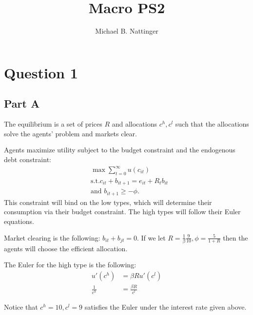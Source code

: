 \documentclass[11pt]{article} %
\title{Macro PS2}
\author{Michael B. Nattinger}
\begin{document}
\maketitle
\section{Question 1}
\subsection{Part A}
%
The equilibrium is a set of prices $R$ and allocations $c^h,c^l$ such that the allocations solve the agents' problem and markets clear.

Agents maximize utility subject to the budget constraint and the endogenous debt constraint:
\begin{align*}
&\max \sum_{t=0}^{\infty} u(c_{it})\\
&\text{s.t.} c_{it} + b_{it+1} = e_{it} + R_tb_{it}\\
&\text{and } b_{it+1} \geq -\phi.
\end{align*}
This constraint will bind on the low types, which will determine their consumption via their budget constraint. The high types will follow their Euler equations.

Market clearing is the following: $b_{it} + b_{jt} = 0$. If we let $R = \frac{1}{\beta}\frac{9}{10},\phi = \frac{5}{1+R}$ then the agents will choose the efficient allocation.

The Euler for the high type is the following:
\begin{align*}
u'(c^h) &= \beta R u'(c^l)\\
\frac{1}{c^h} &= \frac{\beta R}{c^l}
\end{align*}

Notice that $c^h = 10,c^l = 9 $ satisfies the Euler under the interest rate given above.
\end{document}
